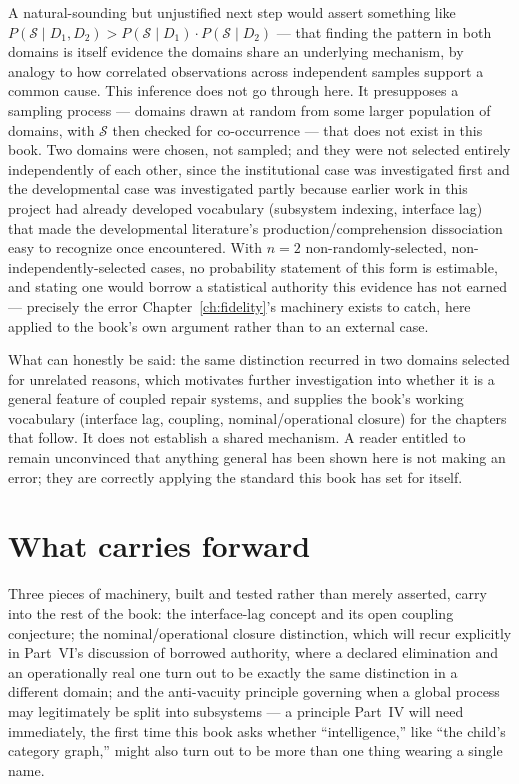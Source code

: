 A natural-sounding but unjustified next step would assert something like $P(\mathcal{S}\mid D_1, D_2) > P(\mathcal{S}\mid D_1)\cdot P(\mathcal{S}\mid D_2)$ --- that finding the pattern in both domains is itself evidence the domains share an underlying mechanism, by analogy to how correlated observations across independent samples support a common cause. This inference does not go through here. It presupposes a sampling process --- domains drawn at random from some larger population of domains, with $\mathcal{S}$ then checked for co-occurrence --- that does not exist in this book. Two domains were chosen, not sampled; and they were not selected entirely independently of each other, since the institutional case was investigated first and the developmental case was investigated partly because earlier work in this project had already developed vocabulary (subsystem indexing, interface lag) that made the developmental literature's production/comprehension dissociation easy to recognize once encountered. With $n=2$ non-randomly-selected, non-independently-selected cases, no probability statement of this form is estimable, and stating one would borrow a statistical authority this evidence has not earned --- precisely the error Chapter~\ref{ch:fidelity}'s machinery exists to catch, here applied to the book's own argument rather than to an external case.

What can honestly be said: the same distinction recurred in two domains selected for unrelated reasons, which motivates further investigation into whether it is a general feature of coupled repair systems, and supplies the book's working vocabulary (interface lag, coupling, nominal/operational closure) for the chapters that follow. It does not establish a shared mechanism. A reader entitled to remain unconvinced that anything general has been shown here is not making an error; they are correctly applying the standard this book has set for itself.

\section{What carries forward}

Three pieces of machinery, built and tested rather than merely asserted, carry into the rest of the book: the interface-lag concept and its open coupling conjecture; the nominal/operational closure distinction, which will recur explicitly in Part~VI's discussion of borrowed authority, where a declared elimination and an operationally real one turn out to be exactly the same distinction in a different domain; and the anti-vacuity principle governing when a global process may legitimately be split into subsystems --- a principle Part~IV will need immediately, the first time this book asks whether ``intelligence,'' like ``the child's category graph,'' might also turn out to be more than one thing wearing a single name.
